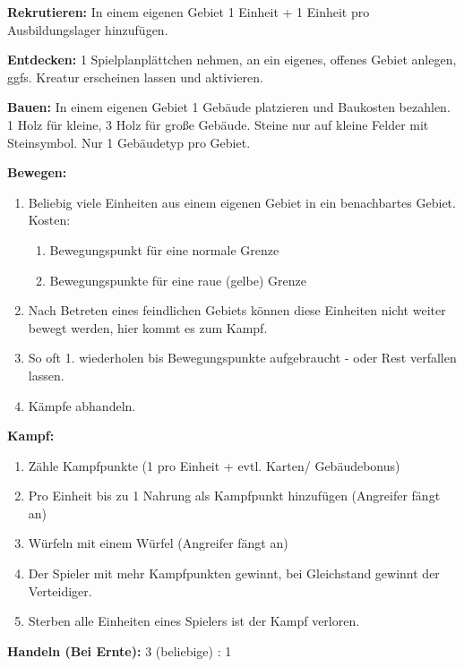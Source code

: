 \documentclass[fontsize=6pt]{scrreprt}
\begin{document}
  \textbf{Rekrutieren:}
  In einem eigenen Gebiet 1 Einheit + 1 Einheit pro Ausbildungslager hinzufügen.

  \textbf{Entdecken:}
  1 Spielplanplättchen nehmen, an ein eigenes, offenes Gebiet anlegen,
  ggfs. Kreatur erscheinen lassen und aktivieren.

  \textbf{Bauen:}
  In einem eigenen Gebiet 1 Gebäude platzieren und Baukosten bezahlen.
  1 Holz für kleine, 3 Holz für große Gebäude.
  Steine nur auf kleine Felder mit Steinsymbol.
  Nur 1 Gebäudetyp pro Gebiet.

  \textbf{Bewegen:}
  \begin{enumerate}[topsep=1pt, partopsep=0pt, parsep=0pt, itemsep=0pt, leftmargin=12pt]
    \item Beliebig viele Einheiten aus einem eigenen Gebiet in ein benachbartes Gebiet. Kosten:
    \begin{enumerate}[label=\textbf{\arabic*x}, topsep=0pt, partopsep=0pt, parsep=0pt, itemsep=0pt, leftmargin=10pt]
      \item Bewegungspunkt für eine normale Grenze
      \item Bewegungspunkte für eine raue (gelbe) Grenze
    \end{enumerate}
    \item Nach Betreten eines feindlichen Gebiets können diese Einheiten nicht weiter bewegt werden, hier kommt es zum Kampf.
    \item So oft 1. wiederholen bis Bewegungspunkte aufgebraucht - oder Rest verfallen lassen.
    \item Kämpfe abhandeln.
  \end{enumerate}

  \textbf{Kampf:}
  \begin{enumerate}[topsep=1pt, partopsep=0pt, parsep=0pt, itemsep=0pt, leftmargin=12pt]
    \item Zähle Kampfpunkte (1 pro Einheit + evtl. Karten/ Gebäudebonus)
    \item Pro Einheit bis zu 1 Nahrung als Kampfpunkt hinzufügen (Angreifer fängt an)
    \item Würfeln mit einem Würfel (Angreifer fängt an)
    \item Der Spieler mit mehr Kampfpunkten gewinnt, bei Gleichstand gewinnt der Verteidiger.
    \item Sterben alle Einheiten eines Spielers ist der Kampf verloren.
  \end{enumerate}

  \textbf{Handeln (Bei Ernte):} 3 (beliebige) : 1
\end{document}

